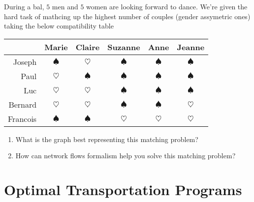 \documentclass[11pt,a4paper]{article}
\begin{document}
\begin{question}[subtitle={Pairings}]
  During a bal, $5$ men and $5$ women are looking forward to
  dance. We're given the hard task of mathcing up the highest number
  of couples (gender assymetric ones) taking the below compatibility
  table
    \begin{center}
    \renewcommand{\arraystretch}{1.5}
    \begin{tabular}{r|c|c|c|c|c}
      & Marie & Claire & Suzanne & Anne & Jeanne \\
      \hline
      Joseph &  $\spadesuit$ &  $\heartsuit$ & $\spadesuit$ & $\spadesuit$ & $\spadesuit$ \\
      \hline
      Paul &  $\heartsuit$ & $\spadesuit$ & $\spadesuit$ & $\spadesuit$ & $\spadesuit$  \\
      \hline
      Luc &  $\heartsuit$ & $\heartsuit$  & $\spadesuit$ & $\spadesuit$ & $\spadesuit$  \\
      \hline
      Bernard & $\heartsuit$ & $\heartsuit$  &  $\spadesuit$ & $\spadesuit$ & $\heartsuit$  \\
      \hline
      Francois & $\spadesuit$  & $\spadesuit$  & $\heartsuit$ & $\heartsuit$ & $\heartsuit$ \\
    \end{tabular}
  \end{center}
  \begin{enumerate}
  \item What is the graph best representing this matching problem?
  \item How can network flows formalism help you solve this matching problem?
  \end{enumerate}
\end{question}


\section{Optimal Transportation Programs}
\end{document}

